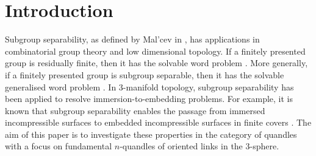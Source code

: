 \documentclass[12pt]{amsart}
\theoremstyle{definition}
\numberwithin{equation}{subsection}
\begin{document}
\section{Introduction}
Subgroup separability, as defined by Mal'cev in \cite{Malvev1958}, has applications in combinatorial group theory and low dimensional topology. If a finitely presented group is residually finite, then it has the solvable word problem \cite{MR0008991}. More generally, if a finitely presented group is subgroup separable, then it has the solvable generalised word problem \cite{Malvev1958}. In 3-manifold topology, subgroup separability has been applied to resolve immersion-to-embedding problems. For example, it is known that subgroup separability enables the passage from immersed incompressible surfaces to embedded incompressible surfaces in finite covers \cite{MR1851085}. The aim of this paper is to investigate these properties in the category of quandles with a focus on fundamental $n$-quandles of oriented links in the 3-sphere. 
\par 
\end{document}
